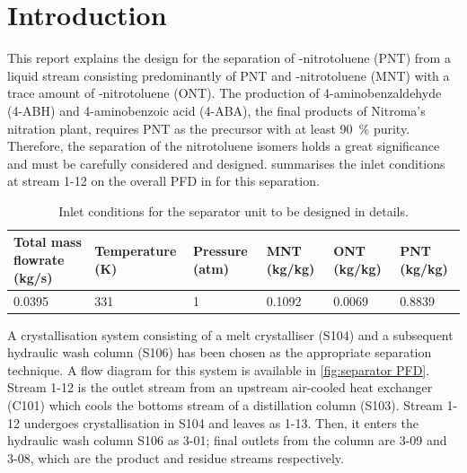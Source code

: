 \section{Introduction}

This report explains the design for the separation of \para-nitrotoluene (PNT) from a liquid stream consisting predominantly of PNT and \meta-nitrotoluene (MNT) with a trace amount of \ortho-nitrotoluene (ONT). The production of 4-aminobenzaldehyde (4-ABH) and 4-aminobenzoic acid (4-ABA), the final products of Nitroma's nitration plant, requires PNT as the precursor with at least \SI{90}{\percent} purity. Therefore, the separation of the nitrotoluene isomers holds a great significance and must be carefully considered and designed.  summarises the inlet conditions at stream 1-12 on the overall PFD in for this separation. 

\begin{table}[h] 
\centering
\caption{Inlet conditions for the separator unit to be designed in details.}
\begin{tabular}{@{}l|l|l|l|l|l@{}}
\toprule
\textbf{Total mass flowrate (kg/s)}  & \textbf{Temperature (K)}  & \textbf{Pressure (atm)} & \textbf{MNT (kg/kg)} & \textbf{ONT (kg/kg)} & \textbf{PNT (kg/kg)}   \\ \midrule
0.0395  & 331 &  1 & 0.1092 & 0.0069  &   0.8839 \\ \bottomrule
\end{tabular}
\label{tab:inlet crystalliser}
\end{table}

A crystallisation system consisting of a melt crystalliser (S104) and a subsequent hydraulic wash column (S106) has been chosen as the appropriate separation technique. A flow diagram for this system is available in \cref{fig:separator PFD}. Stream 1-12 is the outlet stream from an upstream air-cooled heat exchanger (C101) which cools the bottoms stream of a distillation column (S103). Stream 1-12 undergoes crystallisation in S104 and leaves as 1-13. Then, it enters the hydraulic wash column S106 as 3-01; final outlets from the column are 3-09 and 3-08, which are the product and residue streams respectively. 


